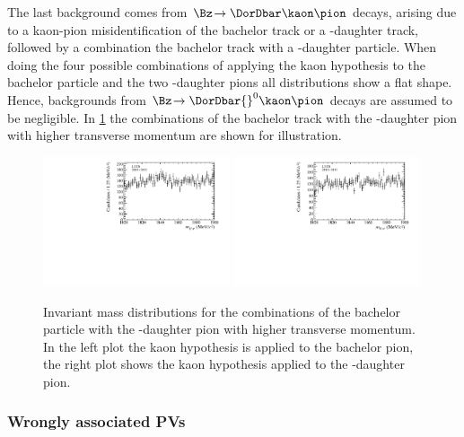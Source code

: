 The last background comes from $\Bz\!\to\DorDbar\kaon\pion$ decays, arising due to a kaon-pion misidentification of the bachelor track or a \Dm-daughter track, followed by a combination the bachelor track with a \Dm-daughter particle.
When doing the four possible combinations of applying the kaon hypothesis to the bachelor particle and the two \Dm-daughter pions all distributions show a flat shape.
Hence, backgrounds from $\Bz\!\to\DorDbar{}^0\kaon\pion$ decays are assumed to be negligible.
In \cref{fig:DzVeto} the combinations of the bachelor track with the \Dm-daughter pion with higher transverse momentum are shown for illustration.
\begin{figure}[tbp]
    \centering
    \includegraphics[width=0.49\textwidth]{06selection/figs/D0Hypo3.pdf}
    \includegraphics[width=0.49\textwidth]{06selection/figs/D0Hypo4.pdf}
    \caption{Invariant mass distributions for the combinations of the bachelor particle with the \Dm-daughter pion with higher transverse momentum.
    In the left plot the kaon hypothesis is applied to the bachelor pion, the right plot shows the kaon hypothesis applied to the \Dm-daughter pion.}
    \label{fig:DzVeto}
\end{figure}

\subsubsection*{Wrongly associated PVs}

